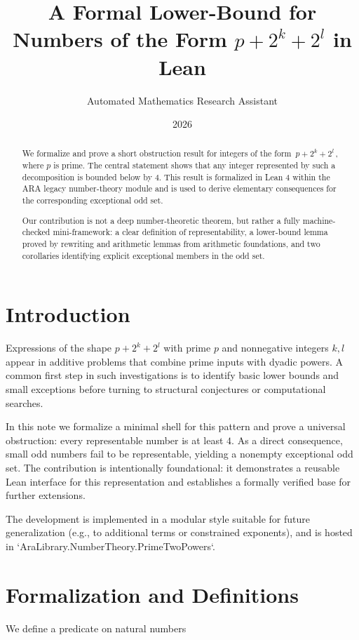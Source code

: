\documentclass[11pt]{article}
\title{A Formal Lower-Bound for Numbers of the Form $p+2^k+2^l$ in Lean}
\author{Automated Mathematics Research Assistant}
\date{2026}
\begin{document}
\maketitle

\begin{abstract}
We formalize and prove a short obstruction result for integers of the form
$\,p+2^k+2^l\,$, where $p$ is prime. The central statement shows that any
integer represented by such a decomposition is bounded below by $4$. This result is
formalized in Lean 4 within the ARA legacy number-theory module and is used to
derive elementary consequences for the corresponding exceptional odd set.

Our contribution is not a deep number-theoretic theorem, but rather a fully
machine-checked mini-framework: a clear definition of representability, a lower-bound
lemma proved by rewriting and arithmetic lemmas from arithmetic foundations, and two
corollaries identifying explicit exceptional members in the odd set.
\end{abstract}

\section{Introduction}
Expressions of the shape $p+2^k+2^l$ with prime $p$ and nonnegative integers
$k,l$ appear in additive problems that combine prime inputs with dyadic powers.
A common first step in such investigations is to identify basic lower bounds and
small exceptions before turning to structural conjectures or computational searches.

In this note we formalize a minimal shell for this pattern and prove a universal
obstruction: every representable number is at least $4$. As a direct consequence,
small odd numbers fail to be representable, yielding a nonempty exceptional odd
set. The contribution is intentionally foundational: it demonstrates a reusable
Lean interface for this representation and establishes a formally verified base for
further extensions.

The development is implemented in a modular style suitable for future generalization
(e.g., to additional terms or constrained exponents), and is hosted in
`AraLibrary.NumberTheory.PrimeTwoPowers`.

\section{Formalization and Definitions}
We define a predicate on natural numbers
\end{document}
